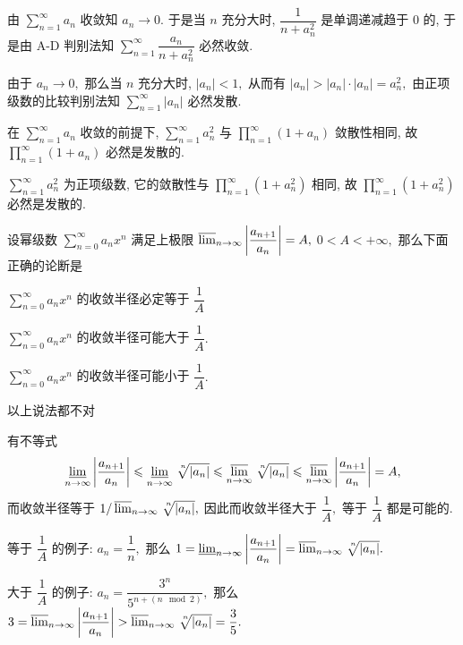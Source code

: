 \begin{solution}
由 $\displaystyle \sum_{n=1}^{\infty} a_n$ 收敛知 $a_n \to 0.$ 于是当 $n$ 充分大时, $\displaystyle \dfrac{1}{n + a_n^2}$ 是单调递减趋于 $0$ 的, 于是由 A-D 判别法知 $\displaystyle \sum_{n=1}^{\infty} \dfrac{a_n}{n + a_n^2}$ 必然收敛.

由于 $a_n \to 0,$ 那么当 $n$ 充分大时, $|a_n| < 1,$ 从而有 $|a_n| > |a_n| \cdot |a_n| = a_n^2,$ 由正项级数的比较判别法知 $\displaystyle \sum_{n=1}^{\infty} |a_n|$ 必然发散.

在 $\displaystyle \sum_{n=1}^{\infty} a_n$ 收敛的前提下, $\displaystyle \sum_{n=1}^{\infty} a_n^2$ 与 $\displaystyle \prod_{n=1}^{\infty} (1 + a_n)$ 敛散性相同, 故 $\displaystyle \prod_{n=1}^{\infty} (1 + a_n)$ 必然是发散的.

$\displaystyle \sum_{n=1}^{\infty} a_n^2$ 为正项级数, 它的敛散性与 $\displaystyle \prod_{n=1}^{\infty} (1 + a_n^2)$ 相同, 故 $\displaystyle \prod_{n=1}^{\infty} (1 + a_n^2)$ 必然是发散的.
\end{solution}

\begin{question}
设幂级数 $\sum\limits_{n=0}^\infty a_n x^n$ 满足上极限 $\varlimsup_{n\to\infty} \left\lvert \dfrac{a_{n+1}}{a_n} \right\rvert = A,$ $0 < A < +\infty,$ 那么下面正确的论断是 \paren[B]

\begin{choices}
\item $\sum\limits_{n=0}^\infty a_n x^n$ 的收敛半径必定等于 $\dfrac{1}{A}$
\item $\sum\limits_{n=0}^\infty a_n x^n$ 的收敛半径可能大于 $\dfrac{1}{A}.$
\item $\sum\limits_{n=0}^\infty a_n x^n$ 的收敛半径可能小于 $\dfrac{1}{A}.$
\item 以上说法都不对
\end{choices}
\end{question}

\begin{solution}
有不等式
$$\varliminf_{n\to\infty} \left\lvert \dfrac{a_{n+1}}{a_n} \right\rvert \leqslant \varliminf_{n\to\infty} \nroot[n]{\lvert a_n \rvert} \leqslant \varlimsup_{n\to\infty} \nroot[n]{\lvert a_n \rvert} \leqslant \varlimsup_{n\to\infty}  \left\lvert \dfrac{a_{n+1}}{a_n} \right\rvert = A,$$
而收敛半径等于 $1 / \varlimsup_{n\to\infty} \nroot[n]{\lvert a_n \rvert},$ 因此而收敛半径大于 $\dfrac{1}{A},$ 等于 $\dfrac{1}{A}$ 都是可能的.

等于 $\dfrac{1}{A}$ 的例子: $a_n = \dfrac{1}{n},$ 那么 $1 = \varliminf_{n\to\infty} \left\lvert \dfrac{a_{n+1}}{a_n} \right\rvert = \varlimsup_{n\to\infty} \nroot[n]{\lvert a_n \rvert}.$

大于 $\dfrac{1}{A}$ 的例子: $a_n = \dfrac{3^{n}}{5^{n + (n \mod 2)}},$ 那么 $3 = \varlimsup_{n\to\infty} \left\lvert \dfrac{a_{n+1}}{a_n} \right\rvert > \varlimsup_{n\to\infty} \nroot[n]{\lvert a_n \rvert} = \dfrac{3}{5}.$
\end{solution}


